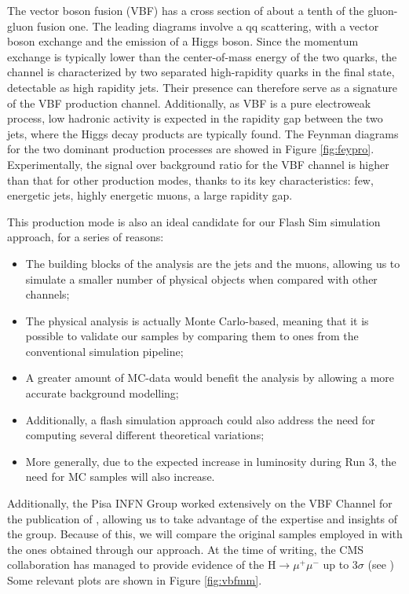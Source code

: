 The vector boson fusion (VBF) has a cross section of about a tenth of the gluon-gluon fusion one. The leading diagrams involve a qq scattering, with a
vector boson exchange and the emission of a Higgs boson. Since the momentum exchange
is typically lower than the center-of-mass energy of the two quarks, the channel is characterized by two separated high-rapidity quarks in the final state, detectable as high rapidity
jets. Their presence can therefore serve as a signature of the VBF production channel. Additionally, as VBF is a pure electroweak process, low hadronic activity is expected in the
rapidity gap between the two jets, where the Higgs decay products are typically found. The Feynman diagrams for the two dominant production processes are showed in Figure \ref{fig:feypro}. Experimentally, the signal over background ratio for the VBF channel is higher than that for other production modes, thanks to its key characteristics: few, energetic jets, highly energetic muons, a large rapidity gap.

This production mode is also an ideal candidate for our Flash Sim simulation approach, for a series of reasons:

\begin{itemize}
    \item The building blocks of the analysis are the jets and the muons, allowing us to simulate a smaller number of physical objects when compared with other channels;
    \item The physical analysis is actually Monte Carlo-based, meaning that it is possible to validate our samples by comparing them to ones from the conventional simulation pipeline;
    \item A greater amount of MC-data would benefit the analysis by allowing a more accurate background modelling;
    \item Additionally, a flash simulation approach could also address the need for computing several different theoretical variations;
    \item More generally, due to the expected increase in luminosity during Run 3, the need for MC samples will also increase.
\end{itemize}

Additionally, the Pisa INFN Group worked extensively on the VBF Channel for the publication of \cite{CMS-PAS-HIG-19-006}, allowing us to take advantage of the expertise and insights of the group.
Because of this, we will compare the original samples employed in \cite{CMS-PAS-HIG-19-006} with the ones obtained through our approach.
At the time of writing, the CMS collaboration has managed to provide evidence of the H$\rightarrow\mu^+\mu^-$ up to 3$\sigma$ (see \cite{Sirunyan_2021}) Some relevant plots are shown in Figure \ref{fig:vbfmm}.

